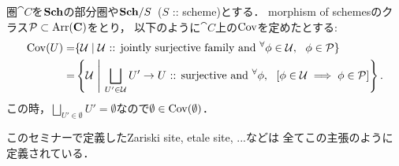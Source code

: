 \documentclass[a4paper]{jsarticle}
\begin{document}
\begin{Example}
    圏$\cat{C}$を$\mathbf{Sch}$の部分圏や$\mathbf{Sch}/S$\ ($S$ :: scheme)とする．
    morphism of schemesのクラス$\mathcal{P} \subset \operatorname{Arr}(\mathbf{C})$をとり，
    以下のように$\cat{C}$上の$\operatorname{Cov}$を定めたとする:
    \begin{align*}
        \operatorname{Cov}(U)
        =&\{
            \mathcal{U} \mid
            \mathcal{U} \text{ :: jointly surjective family and }
            {}^{\forall} \phi \in \mathcal{U},~~ \phi \in \mathcal{P}
        \} \\
        =&\left\{
            \mathcal{U} ~\middle|~
            \bigsqcup_{U' \in \mathcal{U}}U' \to U \text{ :: surjective}
            \text{ and }
            {}^{\forall} \phi,~~ \left[ \phi \in \mathcal{U} \implies \phi \in \mathcal{P} \right]
        \right\}.
    \end{align*}
    この時，$\bigsqcup_{U' \in \emptyset}U'=\emptyset$なので$\emptyset \in \operatorname{Cov}(\emptyset)$．

    このセミナーで定義したZariski site, etale site, ...などは
    全てこの主張のように定義されている．
\end{Example}
\end{document}
